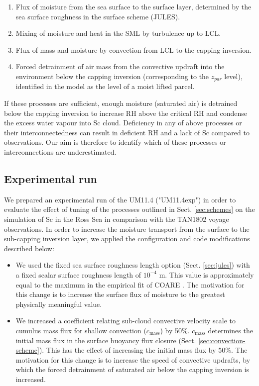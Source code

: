 \begin{enumerate}
\item Flux of moisture from the sea surface to the surface layer, determined
by the sea surface roughness in the surface scheme (JULES).
\item Mixing of moisture and heat in the SML by turbulence up to LCL.
\item Flux of mass and moisture by convection
from LCL to the capping inversion.
\item Forced detrainment of air mass from the convective updraft into the environment
below the capping inversion (corresponding to the $z_{par}$ level),
identified in the model as the level of a moist lifted parcel.
\end{enumerate}

If these processes are sufficient, enough moisture (saturated air) is detrained
below the capping inversion to increase RH above the critical RH and condense the
excess water vapour into Sc
cloud. Deficiency in any of above processes or their interconnectedness can result
in deficient RH and a lack of Sc compared to observations. Our aim is therefore
to identify which of these processes or interconnections are
underestimated.

\subsection{Experimental run}
\label{sec:experimental-run}

We prepared an experimental run of the UM11.4 ("UM11.4exp") in order
to evaluate the effect of tuning of the processes outlined in Sect. 
\ref{sec:schemes} on the simulation of Sc in the Ross Sea in comparison
with the TAN1802 voyage observations. 
In order to increase the moisture
transport from the surface to the sub-capping inversion layer,
we applied the configuration and code modifications described below:

\begin{itemize}
\item We used the fixed sea surface roughness length option
(Sect. \ref{sec:jules}) with a fixed scalar surface roughness length of $10^{-4}$
m. This value is approximately equal to the maximum in the empirical
fit of COARE \citep{fairall2003}. The motivation for this change is to increase
the surface flux of moisture to the greatest physically meaningful value.
\item We increased a coefficient relating sub-cloud convective velocity scale
to cumulus mass flux for shallow convection ($c_\text{mass}$) by 50\%. 
$c_\text{mass}$ determines the initial mass flux in the surface buoyancy
flux closure (Sect. \ref{sec:convection-scheme}). This has the effect
of increasing the initial mass flux by 50\%. The motivation for this change
is to increase the speed of convective updrafts, by which the forced
detrainment of saturated air below the capping inversion is increased.
\end{itemize}

